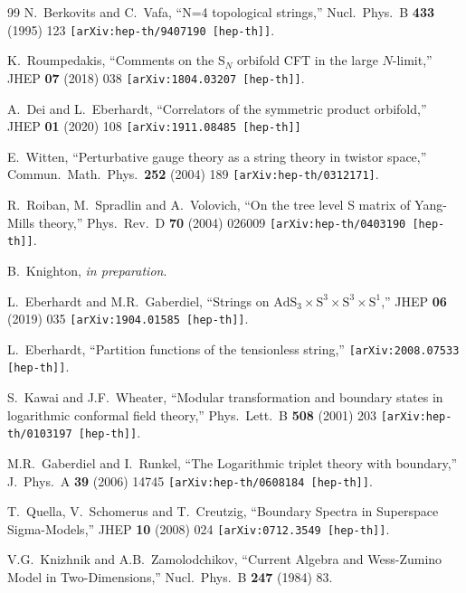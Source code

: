 \documentclass[a4paper,11pt]{article}
\numberwithin{equation}{section}
\begin{document}
\begin{thebibliography}{99}
N.~Berkovits and C.~Vafa,
``N=4 topological strings,''
Nucl.\ Phys.\ B \textbf{433} (1995) 123 %
{\tt [arXiv:hep-th/9407190 [hep-th]]}.

K.~Roumpedakis,
``Comments on the S$_{N}$ orbifold CFT in the large $N$-limit,''
JHEP \textbf{07} (2018) 038
{\tt [arXiv:1804.03207 [hep-th]]}.

A.~Dei and L.~Eberhardt,
``Correlators of the symmetric product orbifold,''
JHEP {\bf 01} (2020) 108
{\tt [arXiv:1911.08485 [hep-th]]}

E.~Witten,
``Perturbative gauge theory as a string theory in twistor space,''
Commun.\ Math.\ Phys.\ \textbf{252} (2004) 189 %
{\tt [arXiv:hep-th/0312171]}.

R.~Roiban, M.~Spradlin and A.~Volovich,
``On the tree level S matrix of Yang-Mills theory,''
Phys.\ Rev.\ D \textbf{70} (2004)  026009
{\tt [arXiv:hep-th/0403190 [hep-th]]}.

B.~Knighton, {\it in preparation}.

L.~Eberhardt and M.R.~Gaberdiel,
``Strings on $\text{AdS}_3 \times \text{S}^3 \times \text{S}^3 \times \text{S}^1$,''
JHEP \textbf{06} (2019) 035
{\tt [arXiv:1904.01585 [hep-th]]}.

L.~Eberhardt,
``Partition functions of the tensionless string,''
{\tt [arXiv:2008.07533 [hep-th]]}.

S.~Kawai and J.F.~Wheater,
``Modular transformation and boundary states in logarithmic conformal field theory,''
Phys.\ Lett.\ B \textbf{508} (2001) 203
{\tt [arXiv:hep-th/0103197 [hep-th]]}.

M.R.~Gaberdiel and I.~Runkel,
``The Logarithmic triplet theory with boundary,''
J.\ Phys.\ A \textbf{39} (2006) 14745 %
{\tt [arXiv:hep-th/0608184 [hep-th]]}.

T.~Quella, V.~Schomerus and T.~Creutzig,
``Boundary Spectra in Superspace Sigma-Models,''
JHEP \textbf{10} (2008) 024
{\tt [arXiv:0712.3549 [hep-th]]}.

V.G.~Knizhnik and A.B.~Zamolodchikov,
``Current Algebra and Wess-Zumino Model in Two-Dimensions,''
Nucl.\ Phys.\ B \textbf{247} (1984)  83. %

         
\end{thebibliography}
\end{document}
